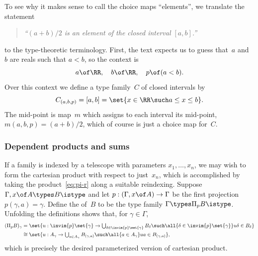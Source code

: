 \begin{example}
  To see why it makes sense to call the choice maps ``elements'',
  we translate the statement
  \begin{quote}
    \emph{``$(a + b)/2$ is an element of the closed interval $[a,b]$.''}
  \end{quote}
  to the type-theoretic terminology. First, the text expects us to guess that~$a$ and~$b$ are reals such that $a < b$, so the context is
  \begin{equation*}
    a \of \RR,\quad b \of \RR,\quad p \of (a < b).
  \end{equation*}
  Over this context we define a type family~$C$ of closed intervals by
  \begin{equation*}
    C_{(a, b, p)} = [a, b] = \set{x \in \RR \such a \leq x \leq b}.
  \end{equation*}
  The mid-point is map~$m$ which assigns to each interval its mid-point, $m(a, b, p) = (a + b)/2$, which of course is just a choice map for~$C$.
\end{example}

\subsubsection{Dependent products and sums}
\label{sec:depend-sums-prod-in-sets}

If a family is indexed by a telescope with parameters $x_1, \ldots, x_n$, we may wish to form the cartesian product with respect to just~$x_n$,
which is accomplished by taking the product~\eqref{eq:pi-r} along a suitable reindexing.
%
Suppose $\Gamma, x \of A \types B \istype$ and let $p : (\Gamma, x \of A) \to \Gamma$ be the first projection $p(\gamma, a) = \gamma$.
%
Define the  of~$B$ to be the type family $\Gamma \types \Pi_p B \istype$.
Unfolding the definitions shows that, for $\gamma \in \Gamma$,
%
\begin{align*}
  (\Pi_p B)_\gamma &=
  \set{ u : \invim{p} \set{\gamma} \to
        \textstyle\bigcup_{\delta \in \invim{p} \set{\gamma}} B_\delta
    \such \all{\delta \in \invim{p} \set{\gamma}} u \delta \in B_\delta
  } \\
  &\cong
  \set{ u : A_\gamma \to
        \textstyle\bigcup_{a \in A_\gamma} B_{(\gamma, a)}
    \such \all{a \in A_\gamma} u a \in B_{(\gamma, a)}
  },
\end{align*}
%
which is precisely the desired parameterized version of cartesian product.

